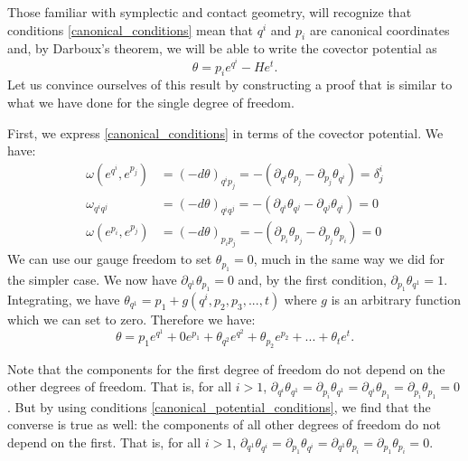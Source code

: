 \documentclass[10pt,twocolumn, nofootinbib]{revtex4-2}
\begin{document}
Those familiar with symplectic and contact geometry, will recognize that conditions \ref{canonical_conditions} mean that $q^i$ and $p_i$ are canonical coordinates and, by Darboux's theorem, we will be able to write the covector potential as
\begin{equation}\label{mdof_potential_expression}
	\theta = p_i e^{q^i} - H e^t.
\end{equation}
Let us convince ourselves of this result by constructing a proof that is similar to what we have done for the single degree of freedom.

First, we express \ref{canonical_conditions} in terms of the covector potential. We have:
\begin{equation}\label{canonical_potential_conditions}
\begin{aligned}
	\omega(e^{q^i}, e^{p_j}) &= (-d\theta)_{q^i p_j} = -(\partial_{q^i}\theta_{p_j} - \partial_{p_j}\theta_{q^i}) = \delta^i_j \\
	\omega_{q^i q^j} &= (-d\theta)_{q^i q^j} = -(\partial_{q^i}\theta_{q^j} - \partial_{q^j}\theta_{q^i}) = 0 \\
	\omega(e^{p_i}, e^{p_j}) &= (-d\theta)_{p_i p_j} = -(\partial_{p_i}\theta_{p_j} - \partial_{p_j}\theta_{p_i}) = 0
\end{aligned}
\end{equation}
We can use our gauge freedom to set $\theta_{p_1} = 0$, much in the same way we did for the simpler case. We now have $\partial_{q^1} \theta_{p_1} = 0$ and, by the first condition, $\partial_{p_1} \theta_{q^1} = 1$. Integrating, we have $\theta_{q^1} = p_1 + g(q^i, p_2, p_3, ..., t)$ where $g$ is an arbitrary function which we can set to zero. Therefore we have:
\begin{equation}
	\theta = p_1 e^{q^1} + 0 e^{p_1} + \theta_{q^2} e^{q^2} + \theta_{p_2} e^{p_2} + ... + \theta_{t} e^{t}.
\end{equation}

Note that the components for the first degree of freedom do not depend on the other degrees of freedom. That is, for all $i>1$, $\partial_{q^i} \theta_{q^1} = \partial_{p_i} \theta_{q^1} = \partial_{q^i} \theta_{p_1} = \partial_{p_i} \theta_{p_1} = 0$. But by using conditions \ref{canonical_potential_conditions}, we find that the converse is true as well: the components of all other degrees of freedom do not depend on the first. That is, for all $i>1$, $\partial_{q^1} \theta_{q^i} = \partial_{p_1} \theta_{q^i} = \partial_{q^1} \theta_{p_i} = \partial_{p_1} \theta_{p_i} = 0$.
\end{document}
